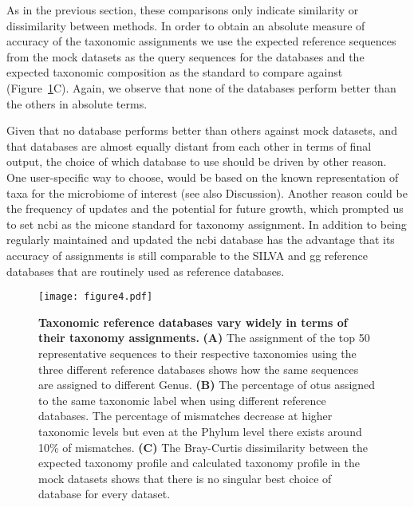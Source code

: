   As in the previous section, these comparisons only indicate similarity or dissimilarity between methods.
  In order to obtain an absolute measure of accuracy of the taxonomic assignments we use the expected reference sequences from the mock datasets as the query sequences for the databases and the expected taxonomic composition as the standard to compare against (Figure~\ref{fig:figure4}C).
  Again, we observe that none of the databases perform better than the others in absolute terms.

  Given that no database performs better than others against mock datasets, and that databases are almost equally distant from each other in terms of final output, the choice of which database to use should be driven by other reason. One user-specific way to choose, would be based on the known representation of taxa for the microbiome of interest (see also Discussion). Another reason could be the frequency of updates and the potential for future growth, which prompted us to set \ac{ncbi} as the \ac{micone} standard for taxonomy assignment.
 In addition to being regularly maintained and updated the \ac{ncbi} database has the advantage that its accuracy of assignments is still comparable to the SILVA and \ac{gg} reference databases that are routinely used as reference databases.

  \begin{figure}[H]
    \centering
    \texttt{[image: figure4.pdf]}
  \end{figure}
  \begin{figure}[!t]
    \centering
    \caption{
      \textbf{Taxonomic reference databases vary widely in terms of their taxonomy assignments.}
      \textbf{(A)} The assignment of the top 50 representative sequences to their respective taxonomies using the three different reference databases shows how the same sequences are assigned to different Genus.
      \textbf{(B)} The percentage of \ac{otu}s assigned to the same taxonomic label when using different reference databases.
      The percentage of mismatches decrease at higher taxonomic levels but even at the Phylum level there exists around 10\% of mismatches.
      \textbf{(C)} The Bray-Curtis dissimilarity between the expected taxonomy profile and calculated taxonomy profile in the mock datasets shows that there is no singular best choice of database for every dataset.
    }
    \label{fig:figure4}
  \end{figure}

    

